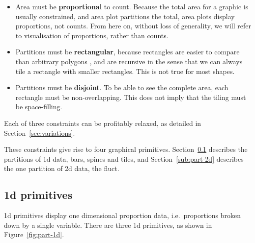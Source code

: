 \documentclass[journal]{vgtc}
\begin{document}
\begin{itemize}

  \item Area must be {\bf proportional} to count. Because the total area for a graphic is usually constrained, and area plot partitions the total, area plots display proportions, not counts. From here on, without loss of generality, we will refer to visualisation of proportions, rather than counts.

  \item Partitions must be {\bf rectangular}, because rectangles are easier to compare than arbitrary polygons \citep{cleveland:1984,cleveland:1986,heer:2010}, and are recursive in the sense that we can always tile a rectangle with smaller rectangles. This is not true for most shapes.

  \item Partitions must be {\bf disjoint}. To be able to see the complete area, each rectangle must be non-overlapping. This does not imply that the tiling must be space-filling.

\end{itemize}

\noindent Each of three constraints can be profitably relaxed, as detailed in Section~\ref{sec:variations}.

These constraints give rise to four graphical primitives. Section~\ref{sub:part-1d} describes the partitions of 1d data, bars, spines and tiles, and Section~\ref{sub:part-2d} describes the one partition of 2d data, the fluct.


\subsection{1d primitives}
\label{sub:part-1d}

1d primitives display one dimensional proportion data, i.e.\ proportions broken down by a single variable. There are three 1d primitives, as shown in Figure~\ref{fig:part-1d}. 
\end{document}
